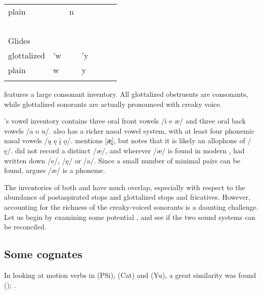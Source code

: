 \documentclass[output=paper]{LSP/langsci}
\begin{document}
\begin{table}[p]
\begin{tabular}{llllll}
plain                       & ~                   & n                    & ~                       & ~                   & ~                \\
~                           & ~                   & ~                    & ~                       & ~                   & ~                \\
 Glides           & ~                   & ~                    & ~                       & ~                   & ~                \\
glottalized                 & 'w                  & ~                    & 'y                      & ~                   & ~                \\
plain                       & w                   & ~                    & y                       & ~                   & ~                \\ \lspbottomrule
\end{tabular}
\end{table}

 features a large consonant inventory. All glottalized obstruents are  consonants, while glottalized sonorants are actually pronounced with creaky voice. 

's vowel inventory contains three oral front vowels /i e \ae/ and three oral back vowels /a o u/.  also has a richer nasal vowel system, with at least four phonemic nasal vowels /\k{a} \k{e} \k{i} \k{o}/. \citet{Linn2000} mentions [\k{\ae}], but notes that it is likely an allophone of /\k{e}/. \citet{Wagner1934} did not record a distinct /\ae/, and wherever /\ae/ is found in modern , \citet{Wagner1934} had written down /e/, /\k{e}/ or /a/. Since a small number of minimal pairs can be found, \citet[44]{Linn2000} argues /\ae/ is a phoneme.

The inventories of both  and  have much overlap, especially with respect to the abundance of postaspirated stops and glottalized stops and fricatives. However, accounting for the richness of the creaky-voiced sonorants is a daunting challenge. Let us begin by examining some potential , and see if the two sound systems can be reconciled.

\subsection{Some cognates}
 
In looking at motion verbs in  (PSi),  (Cat) and  (Yu), a great similarity was found (\citealt{Kasak2013}); .
\end{document}
